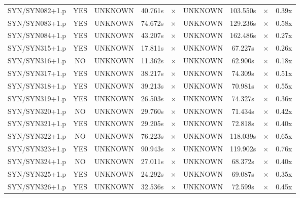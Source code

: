 \documentclass[a4paper,10pt]{article}
\begin{document}
\begin{longtable}{lcccccccc}
SYN/SYN082+1.p & YES & UNKNOWN & 40.761s & \cellcolor{mismatchcolor}$\times$ & UNKNOWN & 103.550s & \cellcolor{mismatchcolor}$\times$ & 0.39x \\
SYN/SYN083+1.p & YES & UNKNOWN & 74.672s & \cellcolor{mismatchcolor}$\times$ & UNKNOWN & 129.236s & \cellcolor{mismatchcolor}$\times$ & 0.58x \\
SYN/SYN084+1.p & YES & UNKNOWN & 43.207s & \cellcolor{mismatchcolor}$\times$ & UNKNOWN & 162.486s & \cellcolor{mismatchcolor}$\times$ & 0.27x \\
SYN/SYN315+1.p & YES & UNKNOWN & 17.811s & \cellcolor{mismatchcolor}$\times$ & UNKNOWN & 67.227s & \cellcolor{mismatchcolor}$\times$ & 0.26x \\
SYN/SYN316+1.p & NO & UNKNOWN & 11.362s & \cellcolor{mismatchcolor}$\times$ & UNKNOWN & 62.900s & \cellcolor{mismatchcolor}$\times$ & 0.18x \\
SYN/SYN317+1.p & YES & UNKNOWN & 38.217s & \cellcolor{mismatchcolor}$\times$ & UNKNOWN & 74.309s & \cellcolor{mismatchcolor}$\times$ & 0.51x \\
SYN/SYN318+1.p & YES & UNKNOWN & 39.213s & \cellcolor{mismatchcolor}$\times$ & UNKNOWN & 70.981s & \cellcolor{mismatchcolor}$\times$ & 0.55x \\
SYN/SYN319+1.p & YES & UNKNOWN & 26.503s & \cellcolor{mismatchcolor}$\times$ & UNKNOWN & 74.327s & \cellcolor{mismatchcolor}$\times$ & 0.36x \\
SYN/SYN320+1.p & NO & UNKNOWN & 29.760s & \cellcolor{mismatchcolor}$\times$ & UNKNOWN & 71.434s & \cellcolor{mismatchcolor}$\times$ & 0.42x \\
SYN/SYN321+1.p & YES & UNKNOWN & 29.205s & \cellcolor{mismatchcolor}$\times$ & UNKNOWN & 72.818s & \cellcolor{mismatchcolor}$\times$ & 0.40x \\
SYN/SYN322+1.p & NO & UNKNOWN & 76.223s & \cellcolor{mismatchcolor}$\times$ & UNKNOWN & 118.039s & \cellcolor{mismatchcolor}$\times$ & 0.65x \\
SYN/SYN323+1.p & YES & UNKNOWN & 90.943s & \cellcolor{mismatchcolor}$\times$ & UNKNOWN & 119.902s & \cellcolor{mismatchcolor}$\times$ & 0.76x \\
SYN/SYN324+1.p & NO & UNKNOWN & 27.011s & \cellcolor{mismatchcolor}$\times$ & UNKNOWN & 68.372s & \cellcolor{mismatchcolor}$\times$ & 0.40x \\
SYN/SYN325+1.p & YES & UNKNOWN & 24.292s & \cellcolor{mismatchcolor}$\times$ & UNKNOWN & 69.087s & \cellcolor{mismatchcolor}$\times$ & 0.35x \\
SYN/SYN326+1.p & YES & UNKNOWN & 32.536s & \cellcolor{mismatchcolor}$\times$ & UNKNOWN & 72.599s & \cellcolor{mismatchcolor}$\times$ & 0.45x \\

\end{longtable}
\end{document}
